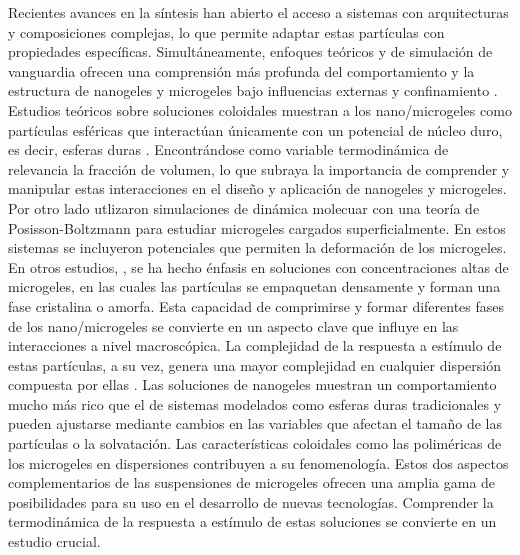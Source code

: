 	Recientes avances en la s\'intesis han abierto el acceso a sistemas con arquitecturas y composiciones complejas, lo que permite adaptar estas part\'iculas  con propiedades espec\'ificas. 
	Simult\'aneamente, enfoques te\'oricos y de simulaci\'on de vanguardia ofrecen una comprensi\'on m\'as profunda del comportamiento y la estructura de nanogeles y microgeles bajo influencias externas y confinamiento \cite{perez2021thermodynamic,scotti2022softness,urich2016swelling}. 
	Estudios te\'oricos sobre soluciones coloidales muestran a los nano/microgeles como part\'iculas esf\'ericas que interact\'uan \'unicamente con un potencial de n\'ucleo duro, es decir, esferas duras \cite{karg2019nanogels}. Encontr\'andose como variable termodin\'amica de relevancia la fracci\'on de volumen, lo que subraya la importancia de comprender y manipular estas interacciones en el dise\~no y aplicaci\'on de nanogeles y microgeles. Por otro lado
	\citet{alziyadi2023osmotic} utlizaron simulaciones de din\'amica molecuar con una teor\'ia de Posisson-Boltzmann para estudiar microgeles cargados superficialmente. En estos sistemas se incluyeron potenciales que permiten la deformaci\'on de los microgeles.
	En otros estudios, \cite{scotti2022softness,scheffold2020pathways}, se ha hecho \'enfasis en soluciones con concentraciones altas de microgeles, en las cuales  las part\'iculas se empaquetan densamente y forman una fase cristalina o amorfa. Esta capacidad de comprimirse y formar diferentes fases de los nano/microgeles se convierte en un aspecto clave que influye en las interacciones a nivel macrosc\'opica.
	La complejidad de la respuesta a est\'imulo de estas part\'iculas, a su vez, genera una mayor complejidad en cualquier dispersi\'on compuesta por ellas \cite{lyon2012polymer}. Las soluciones de nanogeles muestran un comportamiento mucho m\'as rico que el de sistemas modelados como esferas duras tradicionales y pueden ajustarse mediante cambios en las variables que afectan el tama\~no de las part\'iculas o la solvataci\'on.
	Las caracter\'isticas coloidales como las polim\'ericas de los microgeles en dispersiones contribuyen a su fenomenolog\'ia.
	Estos dos aspectos complementarios de las suspensiones de microgeles ofrecen una amplia gama de posibilidades para su uso en el desarrollo de nuevas tecnolog\'ias. 
	Comprender la termodin\'amica de la respuesta a est\'imulo de estas soluciones se convierte en un estudio crucial.
	
